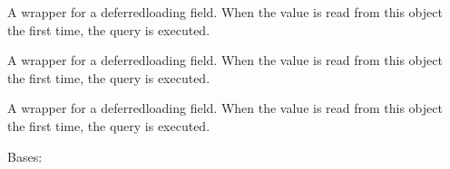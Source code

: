\documentclass[letterpaper,10pt,english]{sphinxmanual}
\begin{document}
\begin{fulllineitems}

\begin{fulllineitems}
\label{\detokenize{index:bookings.models.Capacity.max_places}}
\pysigstartsignatures
\pysigline
{}
\pysigstopsignatures
\sphinxAtStartPar
A wrapper for a deferred\sphinxhyphen{}loading field. When the value is read from this
object the first time, the query is executed.

\end{fulllineitems}


\begin{fulllineitems}
\label{\detokenize{index:bookings.models.Capacity.number_locations}}
\pysigstartsignatures
\pysigline
{}
\pysigstopsignatures
\sphinxAtStartPar
A wrapper for a deferred\sphinxhyphen{}loading field. When the value is read from this
object the first time, the query is executed.

\end{fulllineitems}


\begin{fulllineitems}
\label{\detokenize{index:bookings.models.Capacity.number_mobile_homes}}
\pysigstartsignatures
\pysigline
{}
\pysigstopsignatures
\sphinxAtStartPar
A wrapper for a deferred\sphinxhyphen{}loading field. When the value is read from this
object the first time, the query is executed.

\end{fulllineitems}


\begin{fulllineitems}
\label{\detokenize{index:bookings.models.Capacity.DoesNotExist}}
\pysigstartsignatures
\pysigline
{}
\pysigstopsignatures
\sphinxAtStartPar
Bases: 


\end{fulllineitems}
\end{fulllineitems}
\end{document}
